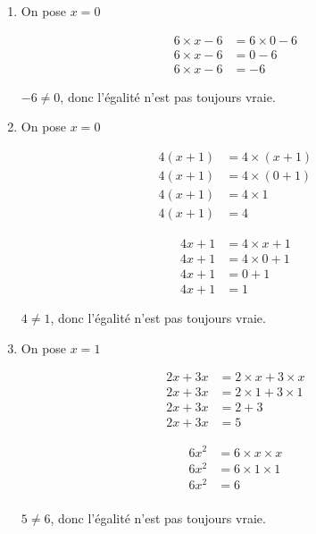 \documentclass[12pt,a4paper]{article}
\begin{document}
\begin{enumerate}
	\item On pose $x= 0$
	
	\begin{align*}
		6 \times x - 6 &= 6 \times 0 - 6 \\
		6 \times x - 6 &= 0 - 6 \\
		6 \times x - 6 &= - 6 
	\end{align*}
	
	$-6 \neq 0$, donc l'égalité n'est pas toujours vraie.
	
	\item On pose $x= 0$
		\begin{multicols}{2}
			\begin{align*}
				4(x+1) &= 4  \times (x+1) \\
				4(x+1) &= 4  \times (0+1) \\
				4(x+1) &= 4  \times 1 \\
				4(x+1) &= 4
			\end{align*}
			
			\begin{align*}
				4x + 1 &= 4  \times x + 1 \\
				4x+1 &= 4  \times 0 +1 \\
				4x+1 &= 0 + 1 \\
				4x+1 &= 1
			\end{align*}
		
	\end{multicols}
	
	
	$4 \neq 1$, donc l'égalité n'est pas toujours vraie.
	
	
	
	\item On pose $x= 1$
	\begin{multicols}{2}
		\begin{align*}
			2x + 3x &= 2 \times x + 3 \times x \\
			2x + 3x &= 2 \times 1 + 3 \times 1 \\
			2x + 3x &= 2 + 3  \\
			2x + 3x &= 5
		\end{align*}
		
		\begin{align*}
			6x^2 &= 6  \times x \times x \\
			6x^2 &= 6  \times 1 \times 1 \\
			6x^2 &= 6 \\
		\end{align*}
		
	\end{multicols}
	
	
	$5 \neq 6$, donc l'égalité n'est pas toujours vraie.
\end{enumerate}
\end{document}
